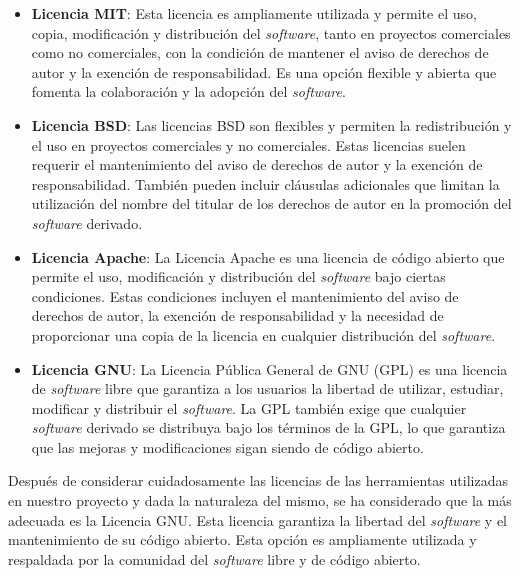 \begin{itemize}
    \item \textbf{Licencia MIT}: Esta licencia es ampliamente utilizada y permite el uso, copia, modificación y distribución del \textit{software}, tanto en proyectos comerciales como no comerciales, con la condición de mantener el aviso de derechos de autor y la exención de responsabilidad. Es una opción flexible y abierta que fomenta la colaboración y la adopción del \textit{software}.

    \item \textbf{Licencia BSD}: Las licencias BSD son flexibles y permiten la redistribución y el uso en proyectos comerciales y no comerciales. Estas licencias suelen requerir el mantenimiento del aviso de derechos de autor y la exención de responsabilidad. También pueden incluir cláusulas adicionales que limitan la utilización del nombre del titular de los derechos de autor en la promoción del \textit{software} derivado.

    \item \textbf{Licencia Apache}: La Licencia Apache es una licencia de código abierto que permite el uso, modificación y distribución del \textit{software} bajo ciertas condiciones. Estas condiciones incluyen el mantenimiento del aviso de derechos de autor, la exención de responsabilidad y la necesidad de proporcionar una copia de la licencia en cualquier distribución del \textit{software}.

    \item \textbf{Licencia GNU}: La Licencia Pública General de GNU (GPL) es una licencia de \textit{software} libre que garantiza a los usuarios la libertad de utilizar, estudiar, modificar y distribuir el \textit{software}. La GPL también exige que cualquier \textit{software} derivado se distribuya bajo los términos de la GPL, lo que garantiza que las mejoras y modificaciones sigan siendo de código abierto.

\end{itemize}

Después de considerar cuidadosamente las licencias de las herramientas utilizadas en nuestro proyecto y dada la naturaleza del mismo, se ha considerado que la más adecuada es la Licencia GNU. Esta licencia garantiza la libertad del \textit{software} y el mantenimiento de su código abierto. Esta opción es ampliamente utilizada y respaldada por la comunidad del \textit{software} libre y de código abierto.

